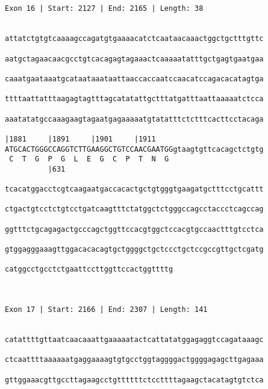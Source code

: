 \documentclass{article}
\begin{document}
\begin{Verbatim}
                                      
 
Exon 16 | Start: 2127 | End: 2165 | Length: 38


attatctgtgtcaaaagccagatgtgaaaacatctcaataacaaactggctgctttgttc
                                                            
aatgctagaacaacgcctgtcacagagtagaaactcaaaaatatttgctgagtgaatgaa
                                                            
caaatgaataaatgcataataaataattaaccaccaatccaacatccagacacatagtga
                                                            
ttttaattatttaagagtagtttagcatatattgctttatgatttaattaaaaatctcca
                                                            
aaatatatgccaaagaagtagaatgagaaaaatgtatatttctctttcacttcctacaga
                                                            
|1881     |1891     |1901     |1911                         
ATGCACTGGGCCAGGTCTTGAAGGCTGTCCAACGAATGGgtaagtgttcacagctctgtg
 C  T  G  P  G  L  E  G  C  P  T  N  G                      
          |631                                              
  
tcacatggacctcgtcaagaatgaccacactgctgtgggtgaagatgctttcctgcattt
                                                            
ctgactgtcctctgtcctgatcaagtttctatggctctgggccagcctaccctcagccag
                                                            
ggtttctgcagagactgcccagctggttccacgtggctccacgtgccaactttgtcctca
                                                            
gtggagggaaagttggacacacagtgctggggctgctccctgctccgccgttgctcgatg
                                                            
catggcctgcctctgaattccttggttccactggttttg
                                       
                                       
 
Exon 17 | Start: 2166 | End: 2307 | Length: 141


catattttgttaatcaacaaattgaaaaatactcattatatggagaggtccagataaagc
                                                            
ctcaattttaaaaaatgaggaaaagtgtgcctggtaggggactggggagagcttgagaaa
                                                            
gttggaaacgttgccttagaagcctgttttttctccttttagaagctacatagtgtctca
                                                            

\end{Verbatim}
\end{document}
